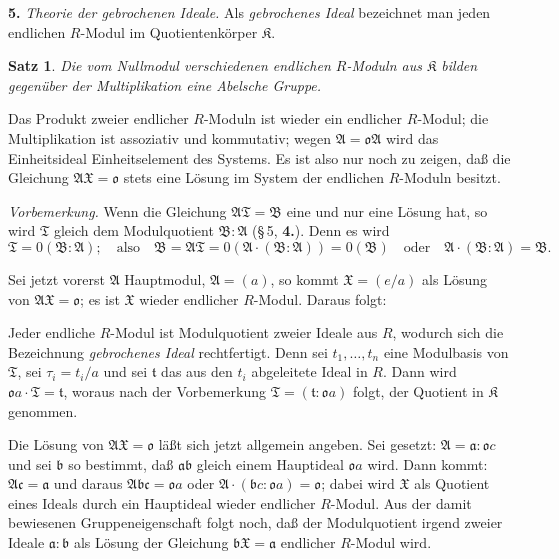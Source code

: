 \documentclass[12pt,a4paper]{article}
\newcommand{\fK}{\mathfrak{K}}
\theoremstyle{plain}
\newtheorem{Satz}{Satz}[section]
\theoremstyle{definition}
\theoremstyle{remark}
\begin{document}
\medskip
\noindent
\textbf{5.} \textit{Theorie der gebrochenen Ideale.} Als \textit{gebrochenes Ideal} bezeichnet man jeden endlichen $R$-Modul im Quotientenkörper $\fK$.

\begin{Satz}
Die vom Nullmodul verschiedenen endlichen $R$-Moduln aus $\fK$ bilden gegenüber der Multiplikation eine Abelsche Gruppe.
\end{Satz}

Das Produkt zweier endlicher $R$-Moduln ist wieder ein endlicher $R$-Modul; die Multiplikation ist assoziativ und kommutativ; wegen $\mathfrak{A} = \mathfrak{o}\mathfrak{A}$ wird das Einheitsideal Einheitselement des Systems. Es ist also nur noch zu zeigen, daß die Gleichung $\mathfrak{A}\mathfrak{X} = \mathfrak{o}$ stets eine Lösung im System der endlichen $R$-Moduln besitzt.

\textit{Vorbemerkung.} Wenn die Gleichung $\mathfrak{A}\mathfrak{T} = \mathfrak{B}$ eine und nur eine Lösung hat, so wird $\mathfrak{T}$ gleich dem Modulquotient $\mathfrak{B}:\mathfrak{A}$ (\S\,5, \textbf{4.}). Denn es wird
\[
\mathfrak{T} = 0(\mathfrak{B}:\mathfrak{A}); \quad \text{also} \quad \mathfrak{B} = \mathfrak{A}\mathfrak{T} = 0(\mathfrak{A} \cdot (\mathfrak{B}:\mathfrak{A})) = 0(\mathfrak{B}) \quad \text{oder} \quad \mathfrak{A} \cdot (\mathfrak{B}:\mathfrak{A}) = \mathfrak{B}.
\]

Sei jetzt vorerst $\mathfrak{A}$ Hauptmodul, $\mathfrak{A} = (a)$, so kommt $\mathfrak{X} = (e/a)$ als Lösung von $\mathfrak{A}\mathfrak{X} = \mathfrak{o}$; es ist $\mathfrak{X}$ wieder endlicher $R$-Modul. Daraus folgt:

Jeder endliche $R$-Modul ist Modulquotient zweier Ideale aus $R$, wodurch sich die Bezeichnung \textit{gebrochenes Ideal} rechtfertigt. Denn sei $t_{1},\dots,t_{n}$ eine Modulbasis von $\mathfrak{T}$, sei $\tau_{i} = t_{i}/a$ und sei $\mathfrak{t}$ das aus den $t_{i}$ abgeleitete Ideal in $R$. Dann wird $\mathfrak{o}a \cdot \mathfrak{T} = \mathfrak{t}$, woraus nach der Vorbemerkung $\mathfrak{T} = (\mathfrak{t}:\mathfrak{o}a)$ folgt, der Quotient in $\fK$ genommen.

Die Lösung von $\mathfrak{A}\mathfrak{X} = \mathfrak{o}$ läßt sich jetzt allgemein angeben. Sei gesetzt: $\mathfrak{A} = \mathfrak{a}:\mathfrak{o}c$ und sei $\mathfrak{b}$ so bestimmt, daß $\mathfrak{a}\mathfrak{b}$ gleich einem Hauptideal $\mathfrak{o}a$ wird. Dann kommt: $\mathfrak{A}\mathfrak{c} = \mathfrak{a}$ und daraus $\mathfrak{A}\mathfrak{b}\mathfrak{c} = \mathfrak{o}a$ oder $\mathfrak{A} \cdot (\mathfrak{b}c:\mathfrak{o}a) = \mathfrak{o}$; dabei wird $\mathfrak{X}$ als Quotient eines Ideals durch ein Hauptideal wieder endlicher $R$-Modul. Aus der damit bewiesenen Gruppeneigenschaft folgt noch, daß der Modulquotient irgend zweier Ideale $\mathfrak{a}:\mathfrak{b}$ als Lösung der Gleichung $\mathfrak{b}\mathfrak{X} = \mathfrak{a}$ endlicher $R$-Modul wird.
\end{document}
